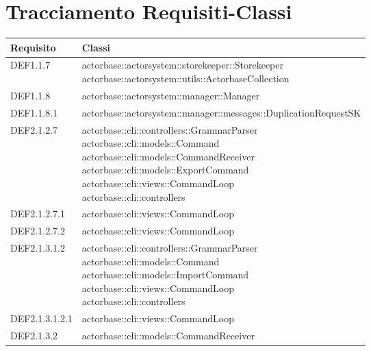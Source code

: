 \documentclass{scalatekids-article}
\begin{document}
\section{Tracciamento Requisiti-Classi}
\begin{longtable}[H]{|p{5cm}|p{12cm}|}
\hline
\textbf{Requisito} & \textbf{Classi}\\
\hline
DEF1.1.7 & \multiLineCell[t]{actorbase::actorsystem::storekeeper::Storekeeper\\actorbase::actorsystem::utils::ActorbaseCollection\\}\\
\hline
DEF1.1.8 & \multiLineCell[t]{actorbase::actorsystem::manager::Manager\\}\\
\hline
DEF1.1.8.1 & \multiLineCell[t]{actorbase::actorsystem::manager::messages::DuplicationRequestSK\\}\\
\hline
DEF2.1.2.7 & \multiLineCell[t]{actorbase::cli::controllers::GrammarParser\\actorbase::cli::models::Command\\actorbase::cli::models::CommandReceiver\\actorbase::cli::models::ExportCommand\\actorbase::cli::views::CommandLoop\\actorbase::cli::controllers\\}\\
\hline
DEF2.1.2.7.1 & \multiLineCell[t]{actorbase::cli::views::CommandLoop\\}\\
\hline
DEF2.1.2.7.2 & \multiLineCell[t]{actorbase::cli::views::CommandLoop\\}\\
\hline
DEF2.1.3.1.2 & \multiLineCell[t]{actorbase::cli::controllers::GrammarParser\\actorbase::cli::models::Command\\actorbase::cli::models::ImportCommand\\actorbase::cli::views::CommandLoop\\actorbase::cli::controllers\\}\\
\hline
DEF2.1.3.1.2.1 & \multiLineCell[t]{actorbase::cli::views::CommandLoop\\}\\
\hline
DEF2.1.3.2 & \multiLineCell[t]{actorbase::cli::models::CommandReceiver\\}\\

\end{longtable}
\end{document}
